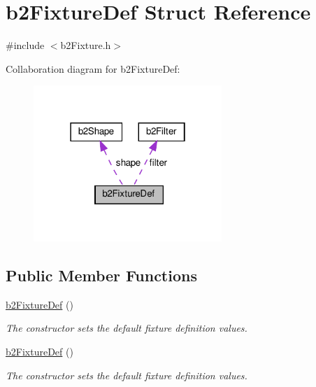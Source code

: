 \hypertarget{structb2FixtureDef}{}\section{b2\+Fixture\+Def Struct Reference}
\label{structb2FixtureDef}


{\ttfamily \#include $<$b2\+Fixture.\+h$>$}



Collaboration diagram for b2\+Fixture\+Def\+:
\nopagebreak
\begin{figure}[H]
\begin{center}
\leavevmode
\includegraphics[width=202pt]{structb2FixtureDef__coll__graph}
\end{center}
\end{figure}
\subsection*{Public Member Functions}
\begin{DoxyCompactItemize}
\item 
\mbox{\label{structb2FixtureDef_aa34ba06bcf0d6d981931a83cf124a602}} 
\hyperlink{structb2FixtureDef_aa34ba06bcf0d6d981931a83cf124a602}{b2\+Fixture\+Def} ()
\begin{DoxyCompactList}\small\item\em The constructor sets the default fixture definition values. \end{DoxyCompactList}\item 
\mbox{\label{structb2FixtureDef_aa34ba06bcf0d6d981931a83cf124a602}} 
\hyperlink{structb2FixtureDef_aa34ba06bcf0d6d981931a83cf124a602}{b2\+Fixture\+Def} ()
\begin{DoxyCompactList}\small\item\em The constructor sets the default fixture definition values. \end{DoxyCompactList}\end{DoxyCompactItemize}
